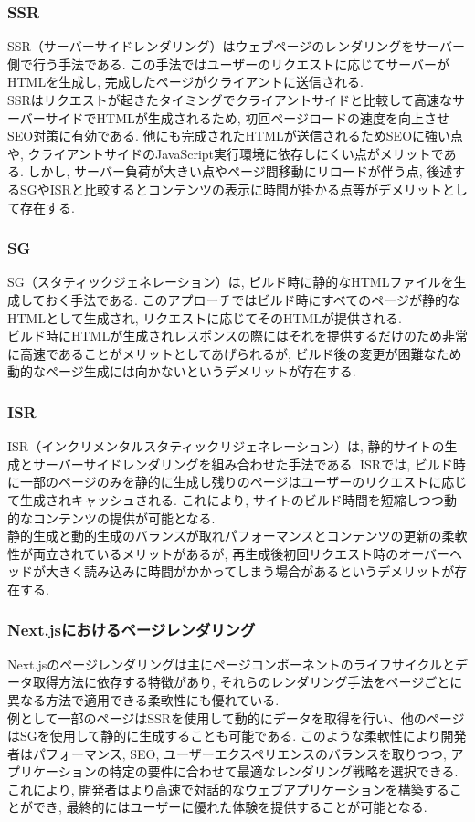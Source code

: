 \subsubsection{SSR}
SSR（サーバーサイドレンダリング）はウェブページのレンダリングをサーバー側で行う手法である.
この手法ではユーザーのリクエストに応じてサーバーがHTMLを生成し, 完成したページがクライアントに送信される. \\
SSRはリクエストが起きたタイミングでクライアントサイドと比較して高速なサーバーサイドでHTMLが生成されるため, 初回ページロードの速度を向上させSEO対策に有効である.
他にも完成されたHTMLが送信されるためSEOに強い点や, クライアントサイドのJavaScript実行環境に依存しにくい点がメリットである.
しかし, サーバー負荷が大きい点やページ間移動にリロードが伴う点, 後述するSGやISRと比較するとコンテンツの表示に時間が掛かる点等がデメリットとして存在する.

\subsubsection{SG}
SG（スタティックジェネレーション）は, ビルド時に静的なHTMLファイルを生成しておく手法である.
このアプローチではビルド時にすべてのページが静的なHTMLとして生成され, リクエストに応じてそのHTMLが提供される.\\
ビルド時にHTMLが生成されレスポンスの際にはそれを提供するだけのため非常に高速であることがメリットとしてあげられるが, ビルド後の変更が困難なため動的なページ生成には向かないというデメリットが存在する.

\subsubsection{ISR}
ISR（インクリメンタルスタティックリジェネレーション）は, 静的サイトの生成とサーバーサイドレンダリングを組み合わせた手法である. 
ISRでは, ビルド時に一部のページのみを静的に生成し残りのページはユーザーのリクエストに応じて生成されキャッシュされる. 
これにより, サイトのビルド時間を短縮しつつ動的なコンテンツの提供が可能となる.\\
静的生成と動的生成のバランスが取れパフォーマンスとコンテンツの更新の柔軟性が両立されているメリットがあるが, 再生成後初回リクエスト時のオーバーヘッドが大きく読み込みに時間がかかってしまう場合があるというデメリットが存在する.

\subsubsection{Next.jsにおけるページレンダリング}
Next.jsのページレンダリングは主にページコンポーネントのライフサイクルとデータ取得方法に依存する特徴があり, それらのレンダリング手法をページごとに異なる方法で適用できる柔軟性にも優れている.\\
例として一部のページはSSRを使用して動的にデータを取得を行い、他のページはSGを使用して静的に生成することも可能である.
このような柔軟性により開発者はパフォーマンス, SEO, ユーザーエクスペリエンスのバランスを取りつつ, アプリケーションの特定の要件に合わせて最適なレンダリング戦略を選択できる.
これにより, 開発者はより高速で対話的なウェブアプリケーションを構築することができ, 最終的にはユーザーに優れた体験を提供することが可能となる.

